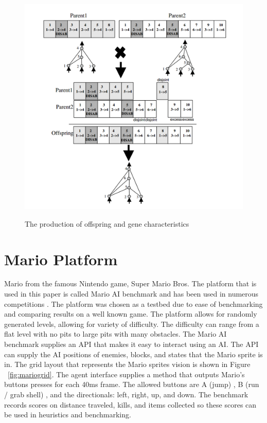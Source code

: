\documentclass[12pt]{ucthesis} \newif\ifpdf \ifx\pdfoutput\undefined
\begin{document}
\begin{figure}[h!] 
\caption{The production of offspring and gene characteristics
\cite{stanley:phd04}}
  \centering
    \includegraphics[width=1\textwidth]{parentgenes.png}
   \label{fig:parentgenes}
\end{figure}


\section{Mario Platform}
Mario from the famous Nintendo game, Super Mario Bros. The platform
that is used in this paper is called Mario AI benchmark and has been used in
numerous competitions \cite{karakovskiy2012mario}. The platform was chosen as a
testbed due to ease of benchmarking and comparing results on a well
known game. The platform allows for randomly generated levels, allowing for
variety of difficulty. The difficulty can range from a flat level with no pits to large
pits with many obstacles. The Mario AI benchmark supplies an API that makes it
easy to interact using an AI. The API can supply the AI positions of enemies, blocks, and states
that the Mario sprite is in. The grid layout that represents the Mario sprites
vision is shown in Figure ~\ref{fig:mariogrid}. The agent interface supplies a method
that outputs Mario’s buttons presses for each 40ms frame. The allowed buttons
are A (jump) , B (run / grab shell) , and the directionals: left, right, up,
and down. The benchmark records scores on distance traveled, kills, and items
collected so these scores can be used in heuristics and benchmarking.
\end{document}

